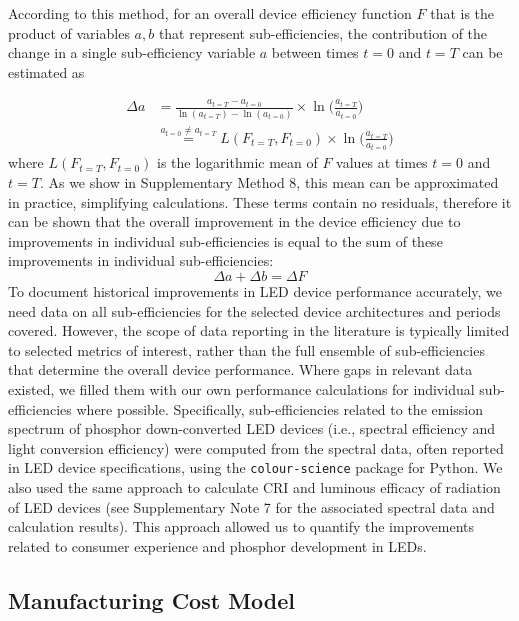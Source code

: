 \documentclass[parskip=full]{article}
\begin{document}
According to this method, for an overall device efficiency function $F$ that is the product of variables $a, b$ that represent sub-efficiencies, the contribution of the change in a single sub-efficiency variable $a$ between times $t=0$ and $t=T$ can be estimated as \cite{Ang2019}

\begin{align}
    \Delta a &= \frac{a_{t=T} - a_{t=0}}{\ln(a_{t=T}) - \ln(a_{t=0})} \times \ln \big ( \frac{a_{t=T}}{a_{t=0}} \big ) \\
    & \stackrel{a_{t=0} \neq a_{t=T}}{=} L(F_{t=T}, F_{t=0}) \times \ln \big ( \frac{a_{t=T}}{a_{t=0}} \big )
\end{align}
%
where $L(F_{t=T}, F_{t=0})$ is the logarithmic mean of $F$ values at times $t=0$ and $t=T$. As we show in Supplementary Method 8, this mean can be approximated in practice, simplifying calculations. These terms contain no residuals, therefore it can be shown that the overall improvement in the device efficiency due to improvements in individual sub-efficiencies is equal to the sum of these improvements in individual sub-efficiencies: 
%
\begin{equation}
    \Delta a + \Delta b  = \Delta F
\end{equation}
%
To document historical improvements in LED device performance accurately, we need data on all sub-efficiencies for the selected device architectures and periods covered. However, the scope of data reporting in the literature is typically limited to selected metrics of interest, rather than the full ensemble of sub-efficiencies that determine the overall device performance. Where gaps in relevant data existed, we filled them with our own performance calculations for individual sub-efficiencies where possible. Specifically, sub-efficiencies related to the emission spectrum of phosphor down-converted LED devices (i.e., spectral efficiency and light conversion efficiency)  were computed from the spectral data, often reported in LED device specifications, using the \texttt{colour-science} package for Python. We also used the same approach to calculate CRI and luminous efficacy of radiation of LED devices (see Supplementary Note 7 for the associated spectral data and calculation results). This approach allowed us to quantify the improvements related to consumer experience and phosphor development in LEDs.

\subsection{Manufacturing Cost Model}
\end{document}

